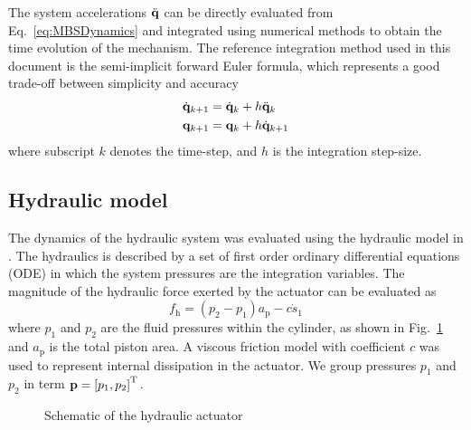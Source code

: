 \documentclass[fleqn,11pt]{article}
\newcommand{\sqbr}[1]{ \left[ #1 \right] }
\newcommand{\trans}		{ ^{\rm T} }
\newcommand{\pos}		{ {\bf{q}} }
\newcommand{\vel}		{ {{\dot{\bf{q}}}} }
\newcommand{\acc}		{ {\ddot{\bf{q}}} }
\newcommand{\pres}		{ {\bf{p}} }
\begin{document}
The system accelerations $\acc$ can be directly evaluated from Eq.~\eqref{eq:MBSDynamics} and integrated using numerical methods to obtain the time evolution of the mechanism.
The reference integration method used in this document is the semi-implicit forward Euler formula, which represents a good trade-off between simplicity and accuracy \cite{Gonzalez2016}
\begin{align}
	\vel_{k+1} &= \vel_k + h \acc_k
	\\
	\pos_{k+1} &= \pos_k + h \vel_{k+1}
	\label{eq:sifwE}
\end{align}
where subscript $k$ denotes the time-step, and $h$ is the integration step-size.


\subsection{Hydraulic model}
\label{HydraulicModel}

The dynamics of the hydraulic system was evaluated using the hydraulic model in \cite{Naya2011}.
The hydraulics is described by a set of first order ordinary differential equations (ODE) in which the system pressures are the integration variables.
The magnitude of the hydraulic force exerted by the actuator can be evaluated as
\begin{equation}
	f_{\text{h}} = \left( p_2 - p_1 \right) a_\text{p} - c \dot{s}_1
	\label{eq:hydForce}
\end{equation}
where $p_1$ and $p_2$ are the fluid pressures within the cylinder, as shown in Fig.~\ref{fig:cylinder} and $a_\text{p}$ is the total piston area.
A viscous friction model with coefficient $c$ was used to represent internal dissipation in the actuator.
We group pressures $p_1$ and $p_2$ in term $\pres = \sqbr{p_1, p_2}\trans$.

\begin{figure}[ht]
	\centering
	\caption{Schematic of the hydraulic actuator}
	\label{fig:cylinder}
\end{figure}
\end{document}
